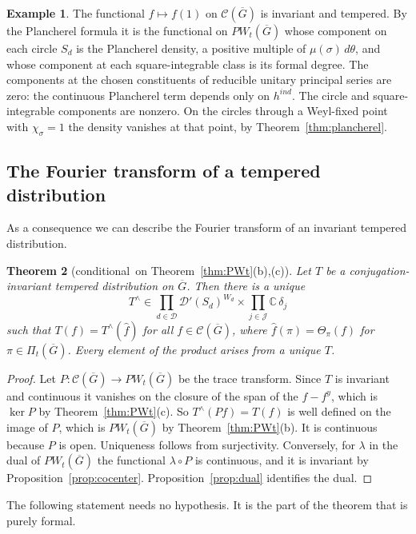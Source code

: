 \documentclass[12pt,letterpaper]{article}
\numberwithin{equation}{section}
\newtheorem{theorem}{Theorem}[section]
\theoremstyle{definition}
\newtheorem{xexample}[theorem]{Example}
\newcommand{\cond}{conditional}
\newcommand{\C}{\mathbb C}
\newcommand{\bG}{\overline{G}}
\newcommand{\calC}{\mathcal C}
\newcommand{\calD}{\mathcal D}
\newcommand{\Pit}{\Pi_{t}(\bG)}
\begin{document}
\begin{xexample}\label{ex:plancherel}
The functional $f\mapsto f(1)$ on $\calC(\bG)$ is invariant and tempered.  By the
Plancherel formula \cite[Corollaire~2.6.5]{Li12} it is the functional on $PW_t(\bG)$ whose
component on each circle $S_d$ is the Plancherel density, a positive multiple of
$\mu(\sigma)\,d\theta$, and whose component at each square-integrable class is its formal
degree. The components at the chosen constituents of reducible unitary
principal series are zero: the continuous Plancherel term depends only on
$h^{ind}$. The circle and square-integrable components are nonzero. On the circles through a
Weyl-fixed point with $\chi_\sigma=1$ the density vanishes at that point, by
Theorem~\ref{thm:plancherel}.
\end{xexample}

\subsection{The Fourier transform of a tempered distribution}

As a consequence we can describe the Fourier transform of an invariant tempered
distribution.

\begin{theorem}[\cond\ on Theorem~\ref{thm:PWt}(b),(c)]\label{thm:FT-dist}
Let $T$ be a conjugation-invariant tempered distribution on $\bG$.  Then there is a unique
\[
T^\wedge\in\prod_{d\in\mathcal D}\calD'(S_d)^{W_d}\times\prod_{j\in\mathcal J}\C\,\delta_j
\]
such that $T(f)=T^\wedge(\hat f)$ for all $f\in\calC(\bG)$, where $\hat f(\pi)=\Theta_\pi(f)$
for $\pi\in\Pit$.  Every element of the product arises from a unique $T$.
\end{theorem}
\begin{proof}
Let $P:\calC(\bG)\to PW_t(\bG)$ be the trace transform.  Since $T$ is invariant and
continuous it vanishes on the closure of the span of the $f-f^y$, which is $\ker P$ by
Theorem~\ref{thm:PWt}(c).  So $T^\wedge(Pf)=T(f)$ is well defined on the image of $P$,
which is $PW_t(\bG)$ by Theorem~\ref{thm:PWt}(b).  It is continuous because $P$ is open.
Uniqueness follows from surjectivity.  Conversely, for $\lambda$ in the dual of
$PW_t(\bG)$ the functional $\lambda\circ P$ is continuous, and it is invariant by
Proposition~\ref{prop:cocenter}.  Proposition~\ref{prop:dual} identifies the dual.
\end{proof}

The following statement needs no hypothesis.  It is the part of the theorem that is
purely formal.
\end{document}

